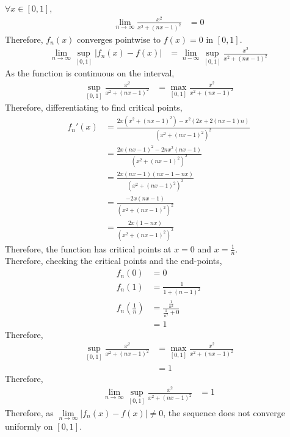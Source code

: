 \documentclass[fleqn, a4paper, 12pt, twoside]{article}
\theoremstyle{definition}
\theoremstyle{theorem}
\begin{document}
\begin{solution}
	$\forall x \in [0,1]$,
	\begin{align*}
		\lim\limits_{n \to \infty} \frac{x^2}{x^2 + (n x - 1)^2} & = 0
	\end{align*}
	Therefore, $f_n(x)$ converges pointwise to $f(x) = 0$ in $[0,1]$.\\
	\begin{align*}
		\lim\limits_{n \to \infty} \sup\limits_{[0,1]} \left| f_n(x) - f(x) \right| & = \lim\limits_{n - \infty} \sup\limits_{[0,1]} \frac{x^2}{x^2 + (n x - 1)^2}
	\end{align*}
	As the function is continuous on the interval,
	\begin{align*}
		\sup\limits_{[0,1]} \frac{x^2}{x^2 + (n x - 1)^2} & = \max\limits_{[0,1]} \frac{x^2}{x^2 + (n x - 1)^2}
	\end{align*}
	Therefore, differentiating to find critical points,
	\begin{align*}
		{f_n}'(x) & = \frac{2 x \left( x^2 + (n x - 1)^2 \right) - x^2 \left( 2 x + 2 (n x - 1) n \right)}{\left( x^2 + (n x - 1)^2 \right)^2} \\
                          & = \frac{2 x (n x - 1)^2 - 2 n x^2 (n x - 1)}{\left( x^2 + (n x - 1)^2 \right)^2}                                           \\
                          & = \frac{2 x (n x - 1) (n x - 1 - n x)}{\left( x^2 + (n x - 1)^2 \right)^2}                                                 \\
                          & = \frac{-2 x (n x - 1)}{\left( x^2 + (n x - 1)^2 \right)^2}                                                                \\
                          & = \frac{2 x (1 - n x)}{\left( x^2 + (n x - 1)^2 \right)^2}
	\end{align*}
	Therefore, the function has critical points at $x = 0$ and $x = \frac{1}{n}$.\\
	Therefore, checking the critical points and the end-points,
	\begin{align*}
		f_n(0)                        & = 0                                       \\
		f_n(1)                        & = \frac{1}{1 + (n - 1)^2}                 \\
		f_n\left( \frac{1}{n} \right) & = \frac{\frac{1}{n^2}}{\frac{1}{n^2} + 0} \\
                                              & = 1
	\end{align*}
	Therefore,
	\begin{align*}
		\sup\limits_{[0,1]} \frac{x^2}{x^2 + (n x - 1)^2} & = \max\limits_{[0,1]} \frac{x^2}{x^2 + (n x - 1)^2} \\
                                                                  & = 1
	\end{align*}
	Therefore,
	\begin{align*}
		\lim\limits_{n \to \infty} \sup\limits_{[0,1]} \frac{x^2}{x^2 + (n x - 1)^2} & = 1
	\end{align*}
	Therefore, as $\lim\limits_{n \to \infty} \left| f_n(x) - f(x) \right| \neq 0$, the sequence does not converge uniformly on $[0,1]$.
\end{solution}
\end{document}
